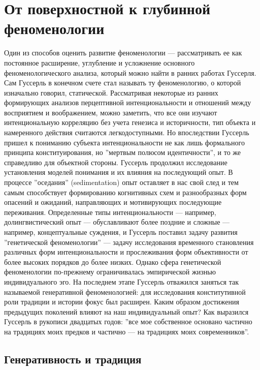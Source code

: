 \documentclass[11pt]{book}
\begin{document}
\chapter{От поверхностной к глубинной феноменологии}

Один из способов оценить развитие феноменологии --- рассматривать ее как постоянное расширение, углубление и усложнение основного феноменологического анализа, который можно найти в ранних работах Гуссерля. Сам Гуссерль в конечном счете стал называть ту феноменологию, о которой изначально говорил, статической. Рассматривая некоторые из ранних формирующих анализов перцептивной интенциональности и отношений между восприятием и воображением, можно заметить, что все они изучают интенциональную корреляцию без учета генезиса и историчности, тип объекта и намеренного действия считаются легкодоступными. Но впоследствии Гуссерль пришел к пониманию субъекта интенциональности не как лишь формального принципа конституирования, но ''мертвым полюсом идентичности'', и то же справедливо для объектной стороны. Гуссерль продолжил исследование установления моделей понимания и их влияния на последующий опыт. В процессе ''оседания'' (sedimentation) опыт оставляет в нас свой след и тем самым способствует формированию когнитивных схем и разнообразных форм опасений и ожиданий, направляющих и мотивирующих последующие переживания. Определенные типы интенциональности --- например, долингвистический опыт --- обуславливают более поздние и сложные --- например, концептуальные суждения, и Гуссерль поставил задачу развития ''генетической феноменологии'' --- задачу исследования временного становления различных форм интенциональности и прослеживания форм объективности от более высоких порядков до более низких. Однако сфера генетической феноменологии по-прежнему ограничивалась эмпирической жизнью индивидуального эго. На последнем этапе Гуссерль отважился заняться так называемой генеративной феноменологией: для исследования конститутивной роли традиции и истории фокус был расширен. Каким образом достижения предыдущих поколений влияют на наш индивидуальный опыт? Как выразился Гуссерль в рукописи двадцатых годов: ''все мое собственное основано частично на традициях моих предков и частично --- на традициях моих современников''.

\section{Генеративность и традиция}
\end{document}

